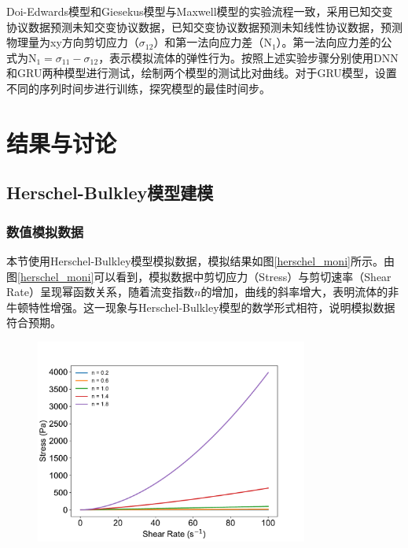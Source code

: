 Doi-Edwards模型和Giesekus模型与Maxwell模型的实验流程一致，采用已知交变协议数据预测未知交变协议数据，已知交变协议数据预测未知线性协议数据，预测物理量为xy方向剪切应力（$\sigma_{12}$）和第一法向应力差（$\text{N}_1$）。第一法向应力差的公式为$\text{N}_1=\sigma_{11}-\sigma_{12} $，表示模拟流体的弹性行为。按照上述实验步骤分别使用DNN和GRU两种模型进行测试，绘制两个模型的测试比对曲线。对于GRU模型，设置不同的序列时间步进行训练，探究模型的最佳时间步。
\section{结果与讨论}
\subsection{Herschel-Bulkley模型建模}
\subsubsection{数值模拟数据}
本节使用Herschel-Bulkley模型模拟数据，模拟结果如图\ref{herschel_moni}所示。由图\ref{herschel_moni}可以看到，模拟数据中剪切应力（Stress）与剪切速率（Shear Rate）呈现幂函数关系，随着流变指数$n$的增加，曲线的斜率增大，表明流体的非牛顿特性增强。这一现象与Herschel-Bulkley模型的数学形式相符，说明模拟数据符合预期。
\begin{figure}[htbp]
  \centering
  \includegraphics[width=0.8\textwidth]{Fig/herschel_moni.pdf}
\end{figure}

